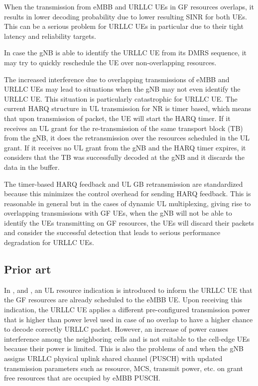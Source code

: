 \documentclass[conference]{IEEEtran}
\begin{document}
When the transmission from eMBB and URLLC UEs in GF resources overlaps, it results in lower decoding probability due to lower resulting SINR for both UEs. This can be a serious problem for URLLC UEs in particular due to their tight latency and reliability targets.

In case the gNB is able to identify the URLLC UE from its DMRS sequence, it may try to quickly reschedule the UE over non-overlapping resources. 

The increased interference due to overlapping transmissions of eMBB and URLLC UEs may lead to situations when the gNB may not even identify the URLLC UE. This situation is particularly catastrophic for URLLC UE. The current HARQ structure in UL transmission for NR is timer based, which means that upon transmission of packet, the UE will start the HARQ timer. If it receives an UL grant for the re-transmission of the same transport block (TB) from the gNB, it does the retransmission over the resources scheduled in the UL grant. If it receives no UL grant from the gNB and the HARQ timer expires, it considers that the TB was successfully decoded at the gNB and it discards the data in the buffer. 

The timer-based HARQ feedback and UL GB retransmission are standardized because this minimizes the control overhead for sending HARQ feedback. This is reasonable in general but in the cases of dynamic UL multiplexing, giving rise to overlapping transmissions with GF UEs, when the gNB will not be able to identify the UEs transmitting on GF resources, the UEs will discard their packets and consider the successful detection that leads to serious performance degradation for URLLC UEs.

\subsection{Prior art}\label{ICC}
In \cite{b1}, \cite{b2} and \cite{b3}, an UL resource indication is introduced to inform the URLLC UE that the GF resources are already scheduled to the eMBB UE. Upon receiving this indication, the URLLC UE applies a different pre-configured transmission power that is higher than power level used in case of no overlap to have a higher chance to decode correctly URLLC packet. However, an increase of power causes interference among the neighboring cells and is not suitable to the cell-edge UEs because their power is limited. This is also the problems of \cite{b4} and \cite{b5} when the gNB assigns URLLC physical uplink shared channel (PUSCH) with updated transmission parameters such as resource, MCS, transmit power, etc. on grant free resources that are occupied by eMBB PUSCH. 
\end{document}
